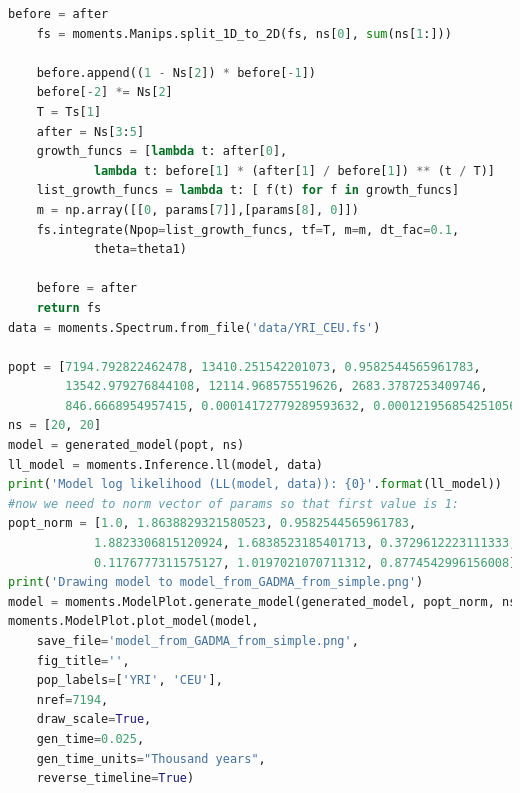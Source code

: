\documentclass[12pt]{article}
\begin{document}
\begin{appendices}
\begin{lstlisting}[language=Python]
	before = after
	fs = moments.Manips.split_1D_to_2D(fs, ns[0], sum(ns[1:]))

	before.append((1 - Ns[2]) * before[-1])
	before[-2] *= Ns[2]
	T = Ts[1]
	after = Ns[3:5]
	growth_funcs = [lambda t: after[0], 
	        lambda t: before[1] * (after[1] / before[1]) ** (t / T)]
	list_growth_funcs = lambda t: [ f(t) for f in growth_funcs]
	m = np.array([[0, params[7]],[params[8], 0]])
	fs.integrate(Npop=list_growth_funcs, tf=T, m=m, dt_fac=0.1,
	        theta=theta1)

	before = after
	return fs
data = moments.Spectrum.from_file('data/YRI_CEU.fs')

popt = [7194.792822462478, 13410.251542201073, 0.9582544565961783,
        13542.979276844108, 12114.968575519626, 2683.3787253409746,
        846.6668954957415, 0.00014172779289593632, 0.00012195685425105608]
ns = [20, 20]
model = generated_model(popt, ns)
ll_model = moments.Inference.ll(model, data)
print('Model log likelihood (LL(model, data)): {0}'.format(ll_model))
#now we need to norm vector of params so that first value is 1:
popt_norm = [1.0, 1.8638829321580523, 0.9582544565961783,
            1.8823306815120924, 1.6838523185401713, 0.3729612223111333,
            0.1176777311575127, 1.0197021070711312, 0.8774542996156008]
print('Drawing model to model_from_GADMA_from_simple.png')
model = moments.ModelPlot.generate_model(generated_model, popt_norm, ns)
moments.ModelPlot.plot_model(model, 
	save_file='model_from_GADMA_from_simple.png',
	fig_title='',
	pop_labels=['YRI', 'CEU'],
	nref=7194,
	draw_scale=True,
	gen_time=0.025,
	gen_time_units="Thousand years",
	reverse_timeline=True)
\end{lstlisting}
\end{appendices}



\end{document}
